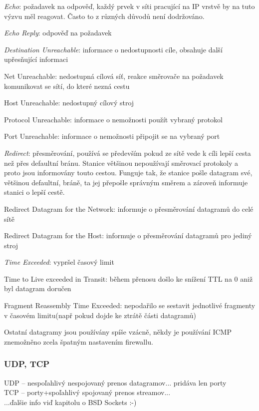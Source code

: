 \begin{pitemize}
    \item \emph{Echo}: požadavek na odpověď, každý prvek v síti pracující na IP vrstvě by na tuto výzvu měl reagovat. Často to z různých důvodů není dodržováno.
    \item \emph{Echo Reply}: odpověď na požadavek
    \item \emph{Destination Unreachable}: informace o nedostupnosti cíle, obsahuje další upřesňující informaci
		\begin{pitemize}
			\item Net Unreachable: nedostupná cílová síť, reakce směrovače na požadavek komunikovat se sítí, do které nezná cestu
			\item Host Unreachable: nedostupný cílový stroj
			\item Protocol Unreachable: informace o nemožnosti použít vybraný protokol
			\item Port Unreachable: informace o nemožnosti připojit se na vybraný port
		\end{pitemize}
    \item \emph{Redirect}: přesměrování, používá se především pokud ze sítě vede k cíli lepší cesta než přes defaultní bránu. Stanice většinou nepoužívají směrovací protokoly a proto jsou informovány touto cestou. Funguje tak, že stanice pošle datagram své, většinou defaultní, bráně, ta jej přepošle správným směrem a zároveň informuje stanici o lepší cestě.
		\begin{pitemize}
			\item Redirect Datagram for the Network: informuje o přesměrování datagramů do celé sítě
			\item Redirect Datagram for the Host: informuje o přesměrování datagramů pro jediný stroj
		\end{pitemize}
    \item \emph{Time Exceeded}: vypršel časový limit
		\begin{pitemize}
			\item Time to Live exceeded in Transit: během přenosu došlo ke snížení TTL na 0 aniž byl datagram doručen
			\item Fragment Reassembly Time Exceeded: nepodařilo se sestavit jednotlivé fragmenty v časovém limitu(např pokud dojde ke ztrátě části datagramů)
		\end{pitemize}
\end{pitemize}

Ostatní datagramy jsou používány spíše vzácně, někdy je používání ICMP znemožněno zcela špatným nastavením firewallu.

\subsubsection*{UDP, TCP}
UDP -- nespoľahlivý nespojovaný prenos datagramov... pridáva len porty\\
TCP -- porty+spoľahlivý spojovaný prenos streamov... \\
...ďalšie info viď kapitolu o BSD Sockets :-) \\
